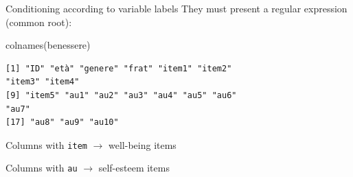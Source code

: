 \documentclass[
  ignorenonframetext,
]{beamer}
\newenvironment{Shaded}{\begin{snugshade}}{\end{snugshade}}
\newcommand{\FunctionTok}[1]{\textcolor[rgb]{0.39,0.29,0.61}{#1}}
\newcommand{\NormalTok}[1]{\textcolor[rgb]{0.12,0.11,0.11}{#1}}
\begin{document}
\begin{frame}[fragile]{Conditioning according to variable labels}
\protect\hypertarget{conditioning-according-to-variable-labels}{}
They must present a regular expression (common root):

\begin{Shaded}
\begin{Highlighting}[]
\FunctionTok{colnames}\NormalTok{(benessere)}
\end{Highlighting}
\end{Shaded}

\begin{verbatim}
[1] "ID" "età" "genere" "frat" "item1" "item2"
"item3" "item4"
[9] "item5" "au1" "au2" "au3" "au4" "au5" "au6"
"au7"
[17] "au8" "au9" "au10"
\end{verbatim}

Columns with \texttt{item} \(\rightarrow\) well-being items

Columns with \texttt{au} \(\rightarrow\) self-esteem items
\end{frame}
\end{document}
